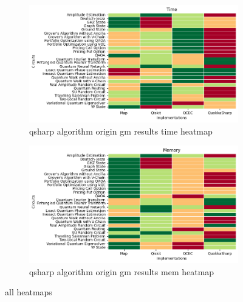 
    \begin{figure}
    \centering
    \begin{subfigure}{.5\textwidth}
      \centering
      \includegraphics[width=1\linewidth]{benchmarks/./qsharp/all/algorithm/qsharp_algorithm_origin_gm_results_time_heatmap.png}
      \caption{qsharp algorithm origin gm results time heatmap}
      \label{fig:gensets_qsharp_algorithm_origin_gm_results_time_heatmap}
    \end{subfigure}
    \begin{subfigure}{.5\textwidth}
      \centering
      \includegraphics[width=1\linewidth]{benchmarks/./qsharp/all/algorithm/qsharp_algorithm_origin_gm_results_mem_heatmap.png}
      \caption{qsharp algorithm origin gm results mem heatmap}
      \label{fig:gensets_qsharp_algorithm_origin_gm_results_mem_heatmap}
    \end{subfigure}
    \caption{all heatmaps}
    \label{fig:gensets_qsharp_algorithm_origin_gm_results_heatmaps}
    \end{figure}
    